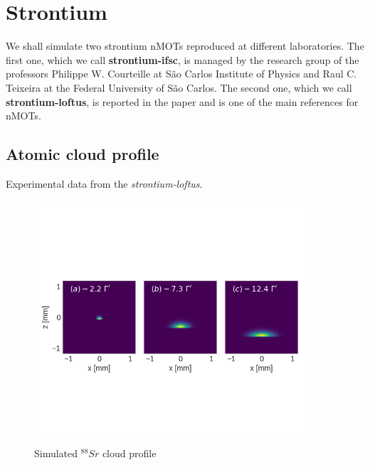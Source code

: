%
\section{Strontium}
\label{eq:strontium}
%

We shall simulate two strontium nMOTs reproduced at different laboratories. The first one, which we call \textbf{strontium-ifsc}, is managed by the research group of the professors Philippe W. Courteille at São Carlos Institute of Physics and Raul C. Teixeira at the Federal University of São Carlos. The second one, which we call \textbf{strontium-loftus}, is reported in the paper \cite{loftus2004narrow} and is one of the main references for nMOTs.

\subsection{Atomic cloud profile}
\label{sec:cloud-profile-dysprosium}

Experimental data from the \textit{strontium-loftus}.

\begin{figure}[!ht]
    \centering
    \caption{Simulated ${}^{88}Sr$ cloud profile}
    \includegraphics[width=0.9\textwidth]{USPSC-img/sr_loftus_cloud_profile.png}
    \vspace{5px}
    \label{fig:sr-loftus-atomic-cloud-profile}
\end{figure}

